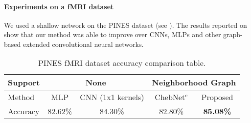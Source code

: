 \paragraph{Experiments on a fMRI dataset}

We used a shallow network on the PINES dataset (see ). The results reported on  show that our method was able to improve over CNNs, MLPs and other graph-based extended convolutional neural networks.

\begin{table}[h!]
\centering
\caption{PINES fMRI dataset accuracy comparison table.}
\label{tab:iaps-table}
\begin{tabular}{|l||c|c||c|c|}
\hline
\multicolumn{1}{|l||}{Support} & \multicolumn{2}{c||}{None} & \multicolumn{2}{c|}{Neighborhood Graph}     \\ \hline
Method                      & MLP & CNN (1x1 kernels)                                & ChebNet$^c$ & Proposed                   \\ \hline
Accuracy                    & 82.62\% & 84.30\%                            & 82.80\%                            & \textbf{85.08\%} \\ \hline
\end{tabular}
\end{table}

